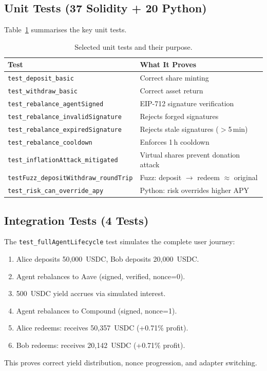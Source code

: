 \documentclass[12pt]{article}
\begin{document}
\subsection{Unit Tests (37 Solidity + 20 Python)}

Table~\ref{tab:unit-tests} summarises the key unit tests.

\begin{table}[H]
\centering
\caption{Selected unit tests and their purpose.}
\label{tab:unit-tests}
\small
\begin{tabular}{@{}ll@{}}
\toprule
\textbf{Test} & \textbf{What It Proves} \\
\midrule
\texttt{test\_deposit\_basic}                & Correct share minting \\
\texttt{test\_withdraw\_basic}               & Correct asset return \\
\texttt{test\_rebalance\_agentSigned}        & EIP-712 signature verification \\
\texttt{test\_rebalance\_invalidSignature}   & Rejects forged signatures \\
\texttt{test\_rebalance\_expiredSignature}   & Rejects stale signatures ($>$5\,min) \\
\texttt{test\_rebalance\_cooldown}           & Enforces 1\,h cooldown \\
\texttt{test\_inflationAttack\_mitigated}    & Virtual shares prevent donation attack \\
\texttt{testFuzz\_depositWithdraw\_roundTrip}& Fuzz: deposit $\to$ redeem $\approx$ original \\
\texttt{test\_risk\_can\_override\_apy}      & Python: risk overrides higher APY \\
\bottomrule
\end{tabular}
\end{table}

\subsection{Integration Tests (4 Tests)}

The \texttt{test\_fullAgentLifecycle} test simulates the complete user journey:
\begin{enumerate}[nosep]
  \item Alice deposits 50{,}000~USDC, Bob deposits 20{,}000~USDC.
  \item Agent rebalances to Aave (signed, verified, nonce=0).
  \item 500~USDC yield accrues via simulated interest.
  \item Agent rebalances to Compound (signed, nonce=1).
  \item Alice redeems: receives 50{,}357~USDC (+0.71\% profit).
  \item Bob redeems: receives 20{,}142~USDC (+0.71\% profit).
\end{enumerate}
This proves correct yield distribution, nonce progression, and adapter switching.
\end{document}
